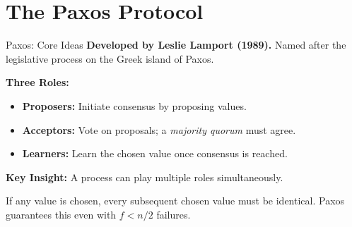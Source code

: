 \section{The Paxos Protocol}

\begin{frame}{Paxos: Core Ideas}
\textbf{Developed by Leslie Lamport (1989).} Named after the legislative process on the Greek island of Paxos.

\vspace{10pt}
\textbf{Three Roles:}
\begin{itemize}
  \item \textbf{Proposers:} Initiate consensus by proposing values.
  \item \textbf{Acceptors:} Vote on proposals; a \emph{majority quorum} must agree.
  \item \textbf{Learners:} Learn the chosen value once consensus is reached.
\end{itemize}

\vspace{8pt}
\textbf{Key Insight:} A process can play multiple roles simultaneously.

\vspace{8pt}
\begin{tcolorbox}[defblock,title={Safety Property}]
If any value is chosen, every subsequent chosen value must be identical. Paxos guarantees this even with $f < n/2$ failures.
\end{tcolorbox}
\end{frame}


